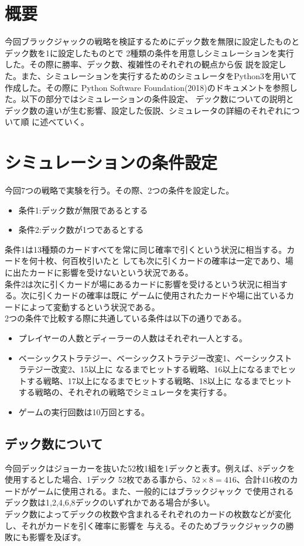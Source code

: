 \section{概要}
今回ブラックジャックの戦略を検証するためにデック数を無限に設定したものとデック数を1に設定したものとで
2種類の条件を用意しシミュレーションを実行した。その際に勝率、デック数、複雑性のそれぞれの観点から仮
説を設定した。また、シミュレーションを実行するためのシミュレータをPython3を用いて作成した。その際に
Python Software Foundation(2018)のドキュメントを参照した。以下の部分ではシミュレーションの条件設定、
デック数についての説明とデック数の違いが生む影響、設定した仮説、シミュレータの詳細のそれぞれについて順
に述べていく。

\section{シミュレーションの条件設定}
今回7つの戦略で実験を行う。その際、2つの条件を設定した。
\begin{itemize}
\item 条件1:デック数が無限であるとする
\item 条件2:デック数が1つであるとする
\end{itemize}
条件1は13種類のカードすべてを常に同じ確率で引くという状況に相当する。カードを何十枚、何百枚引いたと
しても次に引くカードの確率は一定であり、場に出たカードに影響を受けないという状況である。\\
条件2は次に引くカードが場にあるカードに影響を受けるという状況に相当する。次に引くカードの確率は既に
ゲームに使用されたカードや場に出ているカードによって変動するという状況である。\\
2つの条件で比較する際に共通している条件は以下の通りである。
\begin{itemize}
\item プレイヤーの人数とディーラーの人数はそれぞれ一人とする。
\item ベーシックストラテジー、ベーシックストラテジー改変1、ベーシックストラテジー改変2、15以上に
なるまでヒットする戦略、16以上になるまでヒットする戦略、17以上になるまでヒットする戦略、18以上に
なるまでヒットする戦略の、それぞれの戦略でシミュレータを実行する。
\item ゲームの実行回数は10万回とする。
\end{itemize}

\subsection{デック数について}
今回デックはジョーカーを抜いた52枚1組を1デックと表す。例えば、8デックを使用するとした場合、1デック
52枚である事から、$52×8=416$、合計416枚のカードがゲームに使用される。また、一般的にはブラックジャック
で使用されるデック数は1,2,4,6,8デックのいずれかである場合が多い。\\
デック数によってデックの枚数や含まれるそれぞれのカードの枚数などが変化し、それがカードを引く確率に影響を
与える。そのためブラックジャックの勝敗にも影響を及ぼす。

